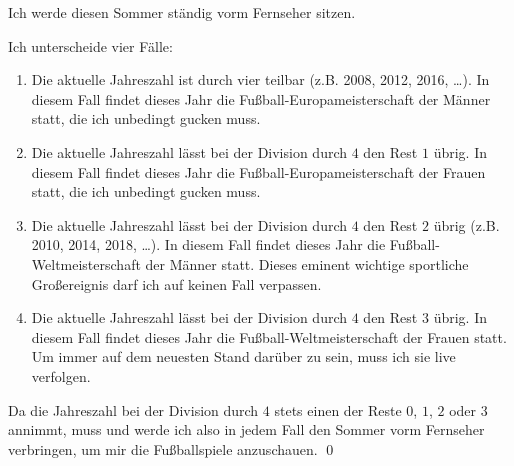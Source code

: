 \begin{bsp}
Ich werde diesen Sommer ständig vorm Fernseher sitzen.
\end{bsp}
\begin{bew}
 Ich unterscheide vier Fälle:
 \begin{enumerate}
  \item Die aktuelle Jahreszahl ist durch vier teilbar (z.B. 2008, 2012, 2016, \dots). In diesem Fall findet dieses Jahr die Fußball-Europameisterschaft der Männer statt, die ich unbedingt gucken muss.
  \item Die aktuelle Jahreszahl lässt bei der Division durch $4$ den Rest $1$ übrig. In diesem Fall findet dieses Jahr die Fußball-Europameisterschaft der Frauen statt, die ich unbedingt gucken muss.
  \item Die aktuelle Jahreszahl lässt bei der Division durch $4$ den Rest $2$ übrig (z.B. 2010, 2014, 2018, \dots). In diesem Fall findet dieses Jahr die Fußball-Weltmeisterschaft der Männer statt. Dieses eminent wichtige sportliche Großereignis darf ich auf keinen Fall verpassen.
  \item Die aktuelle Jahreszahl lässt bei der Division durch $4$ den Rest $3$ übrig. In diesem Fall findet dieses Jahr die Fußball-Weltmeisterschaft der Frauen statt. Um immer auf dem neuesten Stand darüber zu sein, muss ich sie live verfolgen.
 \end{enumerate}
Da die Jahreszahl bei der Division durch $4$ stets einen der Reste $0$, $1$, $2$ oder $3$ annimmt, muss und werde ich also in jedem Fall den Sommer vorm Fernseher verbringen, um mir die Fußballspiele anzuschauen. \qed
\end{bew}





